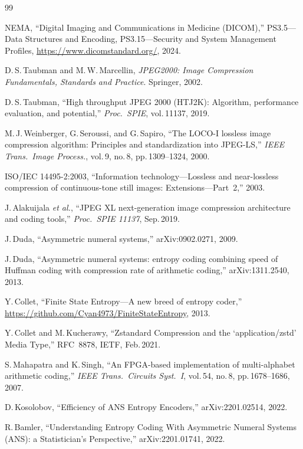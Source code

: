 \documentclass[journal]{IEEEtran}
\begin{document}
\begin{thebibliography}{99}

NEMA, ``Digital Imaging and Communications in Medicine (DICOM),''
PS3.5---Data Structures and Encoding, PS3.15---Security and System Management
Profiles,
\url{https://www.dicomstandard.org/}, 2024.

D.\,S.\,Taubman and M.\,W.\,Marcellin,
\textit{JPEG2000: Image Compression Fundamentals, Standards and Practice}.
Springer, 2002.

D.\,S.\,Taubman, ``High throughput JPEG 2000 (HTJ2K): Algorithm, performance
evaluation, and potential,'' \textit{Proc.\ SPIE}, vol.\,11137, 2019.

M.\,J.\,Weinberger, G.\,Seroussi, and G.\,Sapiro,
``The LOCO-I lossless image compression algorithm: Principles and
standardization into JPEG-LS,''
\textit{IEEE Trans.\ Image Process.}, vol.\,9, no.\,8, pp.\,1309--1324, 2000.

ISO/IEC 14495-2:2003, ``Information technology---Lossless and near-lossless
compression of continuous-tone still images: Extensions---Part~2,'' 2003.

J.\,Alakuijala \textit{et al.},
``JPEG XL next-generation image compression architecture and coding tools,''
\textit{Proc.\ SPIE 11137}, Sep.\,2019.

J.\,Duda, ``Asymmetric numeral systems,'' arXiv:0902.0271, 2009.

J.\,Duda, ``Asymmetric numeral systems: entropy coding combining speed of
Huffman coding with compression rate of arithmetic coding,''
arXiv:1311.2540, 2013.

Y.\,Collet, ``Finite State Entropy---A new breed of entropy coder,''
\url{https://github.com/Cyan4973/FiniteStateEntropy}, 2013.

Y.\,Collet and M.\,Kucherawy,
``Zstandard Compression and the `application/zstd' Media Type,''
RFC~8878, IETF, Feb.\,2021.


S.\,Mahapatra and K.\,Singh,
``An FPGA-based implementation of multi-alphabet arithmetic coding,''
\textit{IEEE Trans.\ Circuits Syst.\ I}, vol.\,54, no.\,8, pp.\,1678--1686,
2007.

D.\,Kosolobov, ``Efficiency of ANS Entropy Encoders,''
arXiv:2201.02514, 2022.

R.\,Bamler, ``Understanding Entropy Coding With Asymmetric Numeral Systems
(ANS): a Statistician's Perspective,'' arXiv:2201.01741, 2022.


\end{thebibliography}
\end{document}
